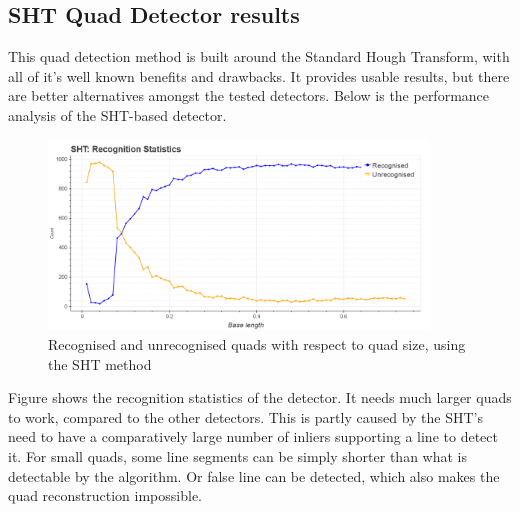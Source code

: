 \clearpage\subsection{SHT Quad Detector results}

This quad detection method is built around the Standard Hough Transform, with all of it's well known benefits and drawbacks.
It provides usable results, but there are better alternatives amongst the tested detectors.
Below is the performance analysis of the SHT-based detector.

\begin{figure}[ht]
	\centering
	\includegraphics[width=0.9\textwidth]{figures/plots/sht_rec_unrec_count.png}
	\caption{Recognised and unrecognised quads with respect to quad size, using the SHT method}
	\label{fig:shtRecCnt}
\end{figure}

Figure  shows the recognition statistics of the detector.
It needs much larger quads to work, compared to the other detectors.
This is partly caused by the SHT's need to have a comparatively large number of inliers supporting a line to detect it.
For small quads, some line segments can be simply shorter than what is detectable by the algorithm.
Or false line can be detected, which also makes the quad reconstruction impossible.

